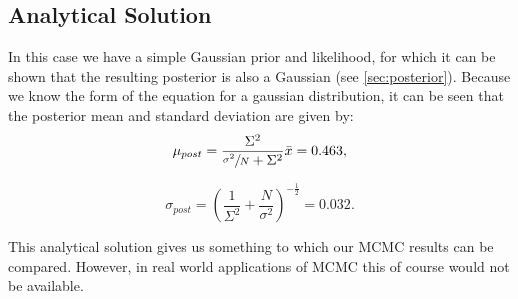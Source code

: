 \documentclass[a4paper,11pt,twoside]{article}
\begin{document}
\subsection{Analytical Solution}
In this case we have a simple Gaussian prior and likelihood, for which it can be shown
that the resulting posterior is also a Gaussian (see \cref{sec:posterior}).
Because we know the form of the equation for a gaussian distribution, it can be
seen that the posterior mean and standard deviation are given by:
\begin{equation}
	\mu_{post} = \frac{\Sigma^2}{\sfrac{\sigma^2}{N} + \Sigma^2} \bar{x} = 0.463,
\end{equation}

\begin{equation}
	\sigma_{post} = \left( \frac{1}{\Sigma^2} + \frac{N}{\sigma^2} \right)^{-\frac{1}{2}} = 0.032.
\end{equation}

This analytical solution gives us something to which our MCMC results can be
compared. However, in real world applications of MCMC this of course would not
be available.
\end{document}
